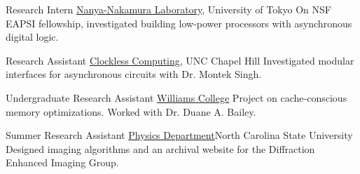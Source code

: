 		{Research Intern}
		{\href{http://www.hal.rcast.u-tokyo.ac.jp/}{Nanya-Nakamura Laboratory}, University of Tokyo}{}{}
		{On NSF EAPSI fellowship, investigated building low-power processors with asynchronous digital logic.}

		{Research Assistant}
		{\href{http://www.cs.unc.edu/~montek/}{Clockless Computing}, UNC Chapel Hill}{}{}
		{Investigated modular interfaces for asynchronous circuits with Dr. Montek Singh.}

		{Undergraduate Research Assistant}
		{\href{http://www.williams.edu}{Williams College}}{}{}
		{Project on cache-conscious memory optimizations.  Worked with Dr. Duane A. Bailey.}

		{Summer Research Assistant}
		{\href{http://physics.ncsu.edu/}{Physics Department}}{North Carolina State University}{}
		{Designed imaging algorithms and an archival website for the Diffraction Enhanced Imaging Group.}
